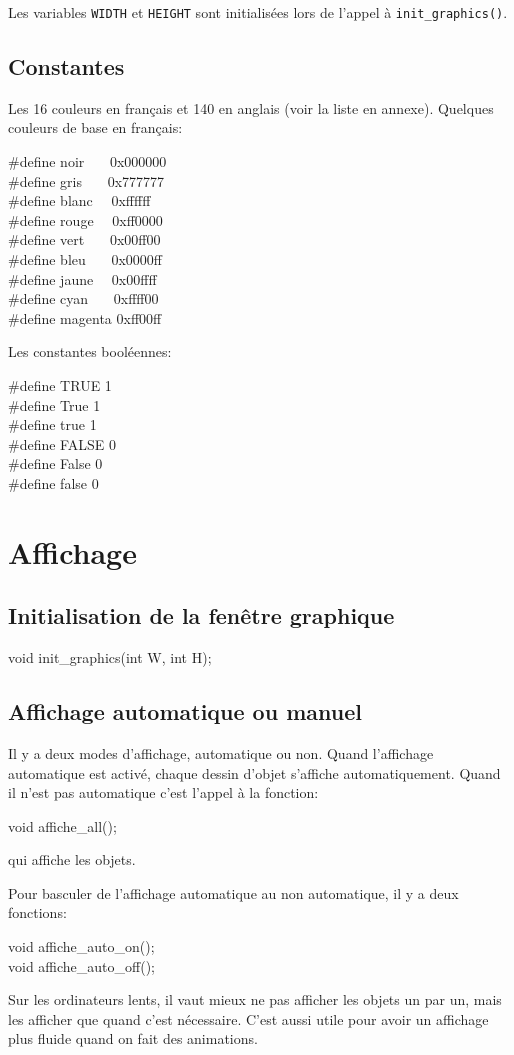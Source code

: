 \documentclass{report}
\newcommand\code[1]{
\begin{mdframed}[linecolor=purple,backgroundcolor=blue!10]
{\tt
#1
}
\end{mdframed}
}
\begin{document}
\noindent
Les variables \texttt{WIDTH} et \texttt{HEIGHT} sont initialisées lors de l'appel à \texttt{init\_graphics()}.

\subsection{Constantes}

Les 16 couleurs en français et 140 en anglais (voir la liste en annexe).
Quelques couleurs de base en français:
\code{
\#define noir~~~ 0x000000 \\
\#define gris~~~ 0x777777 \\
\#define blanc~~ 0xffffff \\
\#define rouge~~ 0xff0000 \\
\#define vert~~~ 0x00ff00 \\
\#define bleu~~~ 0x0000ff \\
\#define jaune~~ 0x00ffff \\
\#define cyan~~~ 0xffff00 \\
\#define magenta 0xff00ff
}

Les constantes booléennes:
\code{
\#define TRUE 1 \\
\#define True 1 \\
\#define true 1 \\
\#define FALSE 0 \\
\#define False 0 \\
\#define false 0 
}


\section{Affichage}
\subsection{Initialisation de la fenêtre graphique}

\code{
void init\_graphics(int W, int H);
}

\subsection{Affichage automatique ou manuel}
\label{sec:aam}
Il y a deux modes d'affichage, automatique ou non. Quand l'affichage 
automatique est activé, chaque dessin d'objet s'affiche automatiquement. 
Quand il n'est pas automatique c'est l'appel à la fonction:
\code{
void affiche\_all();
}
qui affiche les objets.

Pour basculer de l'affichage automatique au non automatique, il y a 
deux fonctions:
\code{
void affiche\_auto\_on(); \\
void affiche\_auto\_off();
}
Sur les ordinateurs lents, il vaut mieux ne pas afficher 
les objets un par un, mais les afficher que quand c'est nécessaire.
C'est aussi utile pour avoir un affichage plus fluide quand on fait
des animations.
\end{document}
